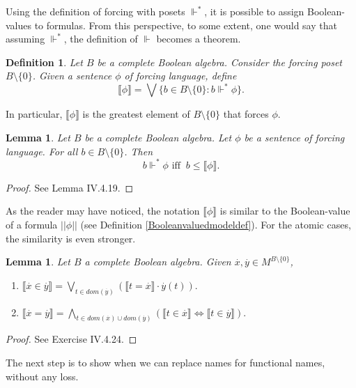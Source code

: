 \documentclass[10pt,longbibliography]{article}
\newtheorem{Def}[Theo]{Definition}
\newtheorem{Lemma}[Theo]{Lemma}
\newcommand{\ydot}{\overset{.}{y}}
\newcommand{\xdot}{\overset{.}{x}}
\newcommand{\forces}{\Vdash^{*}}
\newcommand{\Forces}{\Vdash}
\newcommand{\lb}{\llbracket}
\newcommand{\rb}{\rrbracket}
\begin{document}
Using the definition of forcing with posets $\forces$, it is possible to assign Boolean-values to formulas. From this perspective, to some extent, one would say that assuming $\forces$, the definition of $\Forces$ becomes a theorem.

\begin{Def}\label{quadradinhokunen}
	 Let $B$ be a complete Boolean algebra. Consider the forcing poset $B \setminus \{0\}$. Given a sentence $\phi$ of forcing language, define
	$$ \lb \phi \rb =\bigvee \{b \in B \setminus \{0\} :  b \forces \phi\}.$$
\end{Def}

In particular, $\lb \phi \rb$ is the greatest element of $B \setminus \{0\}$ that forces $\phi$.

\begin{Lemma}\label{Booleanvalueforces}
	Let $B$ be a complete Boolean algebra. Let $\phi$ be a sentence of forcing language. For all $b \in B \setminus \{0\}$. Then
	$$b \forces \phi \text{ iff }~ b \leq \lb \phi \rb.$$
\end{Lemma}
\begin{proof}
	See \cite{Kunen11} Lemma IV.4.19.
\end{proof}

As the reader may have noticed, the notation $\lb \phi \rb$ is similar to the Boolean-value of a formula $|| \phi ||$ {(see Definition \ref{Booleanvaluedmodeldef})}. For the atomic cases, the similarity is even stronger.
\begin{Lemma}\label{quadradinhodokunenparaatomicas}
	Let $B$ a complete Boolean algebra. Given $\xdot, \ydot \in M^{B\setminus \{0\}}$,
	\begin{enumerate}
		\item $\lb \xdot \in \ydot \rb  = \underset{t \in dom(\ydot)}{\bigvee} ( \lb t = \xdot \rb \cdot \ydot(t)).$
		\item $\lb \xdot = \ydot \rb = \underset{t \in dom(\xdot) \cup dom(\ydot)}{\bigwedge} (\lb t \in \xdot \rb \iff \lb t \in \ydot \rb).$
	\end{enumerate}
\end{Lemma}

\begin{proof}
	See \cite{Kunen11} Exercise IV.4.24.
\end{proof}
The next step is to show when we can replace names for functional names, without any loss.
\end{document}

